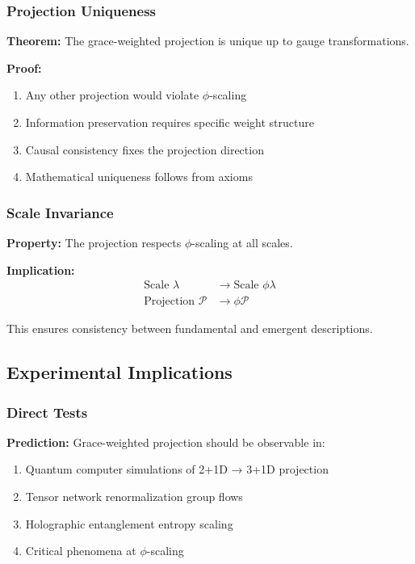 \documentclass[11pt]{article}
\theoremstyle{definition}
\newcommand{\goldenratio}{\phi}
\begin{document}
\subsubsection{Projection Uniqueness}

\textbf{Theorem:} The grace-weighted projection is unique up to gauge transformations.

\textbf{Proof:}
\begin{enumerate}
\item Any other projection would violate $\goldenratio$-scaling
\item Information preservation requires specific weight structure
\item Causal consistency fixes the projection direction
\item Mathematical uniqueness follows from axioms
\end{enumerate}

\subsubsection{Scale Invariance}

\textbf{Property:} The projection respects $\goldenratio$-scaling at all scales.

\textbf{Implication:}
\begin{align}
\text{Scale } \lambda &\to \text{Scale } \goldenratio \lambda \\
\text{Projection } \mathcal{P} &\to \goldenratio \mathcal{P}
\end{align}

This ensures consistency between fundamental and emergent descriptions.

\subsection{Experimental Implications}

\subsubsection{Direct Tests}

\textbf{Prediction:} Grace-weighted projection should be observable in:
\begin{enumerate}
\item Quantum computer simulations of 2+1D → 3+1D projection
\item Tensor network renormalization group flows
\item Holographic entanglement entropy scaling
\item Critical phenomena at $\goldenratio$-scaling
\end{enumerate}
\end{document}
